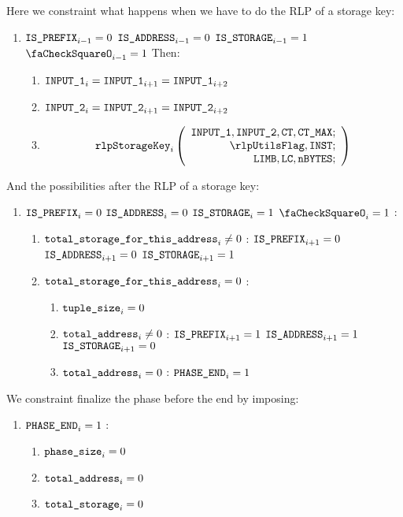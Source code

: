 \begin{enumerate}[resume]
		Here we constraint what happens when we have to do the RLP of a storage key: 
		\begin{enumerate}[resume]
			\item \If $\texttt{IS\_PREFIX}_{i-1} = 0$ \et $\texttt{IS\_ADDRESS}_{i-1} = 0$ \et $\texttt{IS\_STORAGE}_{i-1} = 1$ \et $\done_{i-1} =1$ Then:
				\begin{enumerate}
					\item $\texttt{INPUT\_1}_{i} = \texttt{INPUT\_1}_{i+1} = \texttt{INPUT\_1}_{i+2}$
					\item $\texttt{INPUT\_2}_{i} = \texttt{INPUT\_2}_{i+1} = \texttt{INPUT\_2}_{i+2}$
					\item \[
							\rlpStorageKey_{i}
							\left(
							\begin{array}{r}
								\inputColumn{1},
								\inputColumn{2},
								\ct,
								\maxCt; \\
								\rlpUtilsFlag,
								\INST; \\
								\limb,
								\lc,
								\limbsize; \\
							\end{array}
							\right)
						\]
				\end{enumerate}
		\end{enumerate}
		And the possibilities after the RLP of a storage key:
		\begin{enumerate}[resume]
			\item \If $\texttt{IS\_PREFIX}_{i} = 0$ \et $\texttt{IS\_ADDRESS}_{i} = 0$ \et $\texttt{IS\_STORAGE}_{i} = 1$ \et $\done_{i} =1$ \Then:
				\begin{enumerate}
					\item \If $\texttt{total\_storage\_for\_this\_address}_{i} \neq 0$ \Then: $\texttt{IS\_PREFIX}_{i+1} = 0$ \et $\texttt{IS\_ADDRESS}_{i+1} = 0$ \et $\texttt{IS\_STORAGE}_{i+1} = 1$
					\item \If $\texttt{total\_storage\_for\_this\_address}_{i} = 0$ \Then: 
						\begin{enumerate}
							\item $\texttt{tuple\_size}_{i} = 0$
							\item \If $\texttt{total\_address}_{i} \neq 0$ \Then: $\texttt{IS\_PREFIX}_{i+1} = 1$ \et $\texttt{IS\_ADDRESS}_{i+1} = 1$ \et $\texttt{IS\_STORAGE}_{i+1} = 0$
							\item \If $\texttt{total\_address}_{i} = 0$ \Then: $\texttt{PHASE\_END}_{i} =1$
						\end{enumerate}
				\end{enumerate}
		\end{enumerate}

		We constraint finalize the phase before the end by imposing:
		\begin{enumerate}
			\item \If $\texttt{PHASE\_END}_{i} =1$ \Then: 
				\begin{enumerate}
					\item $\texttt{phase\_size}_{i} =0$
					\item $\texttt{total\_address}_{i} =0$
					\item $\texttt{total\_storage}_{i} =0$
				\end{enumerate}
		\end{enumerate}


\end{enumerate}

